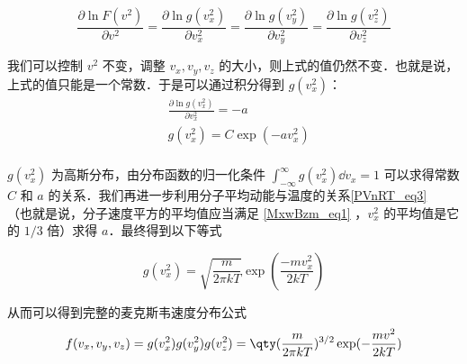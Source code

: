 \begin{equation}
\frac{\partial \ln F(v^2)}{\partial v^2}=\frac{\partial \ln g(v_x^2)}{\partial v_x^2}=\frac{\partial \ln g(v_y^2)}{\partial v_y^2}=\frac{\partial \ln g(v_z^2)}{\partial v_z^2}
\end{equation}

我们可以控制 $v^2$ 不变，调整 $v_x,v_y,v_z$ 的大小，则上式的值仍然不变．也就是说，上式的值只能是一个常数．于是可以通过积分得到 $g(v_x^2)$：
\begin{equation}
\begin{aligned}
&\frac{\partial \ln g(v_x^2)}{\partial v_x^2} = -a\\
&g(v_x^2)=C\exp(-av_x^2)\\
\end{aligned}
\end{equation}

$g(v_x^2)$ 为高斯分布，由分布函数的归一化条件 $\int_{-\infty}^\infty g(v_x^2)\dd v_x=1$ 可以求得常数 $C$ 和 $a$ 的关系．我们再进一步利用分子平均动能与温度的关系\autoref{PVnRT_eq3}~ （也就是说，分子速度平方的平均值应当满足 \autoref{MxwBzm_eq1} ，$v_x^2$ 的平均值是它的 $1/3$ 倍）求得 $a$．最终得到以下等式

\begin{equation}
g(v_x^2)=\sqrt{\frac{m}{2\pi kT}}\exp(\frac{-mv_x^2}{2kT})
\end{equation}

从而可以得到完整的麦克斯韦速度分布公式
\begin{equation}
f(v_x,v_y,v_z)=g(v_x^2)g(v_y^2)g(v_z^2)=\qty(\frac{m}{2\pi k T})^{3/2}\exp(-\frac{mv^2}{2kT})
\end{equation}
